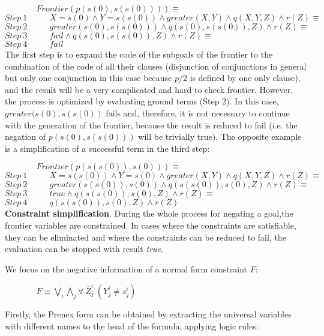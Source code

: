 \documentclass{tlp}
\begin{document}
$~~~~~~~~~~~~~~~~~Frontier(p(s(0),s(s(0)))) \equiv $ \\
$Step~ 1~~~~~~~~~~~~{ X=s(0) \wedge Y=s(s(0)) \wedge
  greater(X,Y) \wedge q(X,Y,Z) \wedge r(Z) } \equiv $ \\
$Step~ 2~~~~~~~~~~~~{ greater(s(0),s(s(0))) \wedge q(s(0),s(s(0)),Z) \wedge r(Z) } \equiv $ \\
$Step~ 3~~~~~~~~~~~~{ fail  \wedge q(s(0),s(s(0)),Z) \wedge r(Z) } \equiv $ \\
$Step~ 4~~~~~~~~~~~~fail $ \\

The first step is to expand the code of the subgoals of the frontier
to the combination of the code of all their clauses (disjunction of
conjunctions in general but only one conjunction in this case because
$p/2$ is defined by one only clause), and the result will be a very
complicated and hard to check frontier.  However, the process is
optimized by evaluating ground terms (Step 2). In this case,
$greater(s(0),s(s(0))$ fails and, therefore, it is not necessary to
continue with the generation of the frontier, because the result is
reduced to fail (i.e. the negation of $p (s(0), s(s(0)))$ will be
trivially true). The opposite example is a simplification of a
successful term in the third step:

$~~~~~~~~~~~~~~~~~Frontier(p(s(s(0)),s(0))) \equiv $\\
$Step~ 1~~~~~~~~~~~~{ X=s(s(0)) \wedge Y=s(0) \wedge greater(X,Y) \wedge q(X,Y,Z) \wedge
  r(Z) } \equiv $ \\
$Step~ 2~~~~~~~~~~~~{ greater(s(s(0)),s(0)) \wedge q(s(s(0)),s(0),Z) \wedge r(Z) } \equiv
$ \\
$Step~ 3~~~~~~~~~~~~{ true \wedge q(s(s(0)),s(0),Z) \wedge r(Z) } \equiv $ \\
$Step~ 4~~~~~~~~~~~~{ q(s(s(0)),s(0),Z) \wedge r(Z) } $ \\

\noindent
{\bf Constraint simplification}. During the whole process for negating
a goal,the frontier variables are constrained. In cases where the
constraints are satisfiable, they can be eliminated and where the
constraints can be reduced to fail, the evaluation can be stopped with
result \emph{true}.
 
We focus on the negative information of a normal form constraint $F$:

$~~~~~~~~~~~~~~~~~ F \equiv  \bigvee_i\bigwedge_j \forall~ \overline{Z}_j^i~(Y_j^i \neq s_j^i)$

Firstly, the Prenex form \cite{Shoenfield} can be obtained by
extracting the universal variables with different names to the head of
the formula, applying logic rules:
\end{document}

